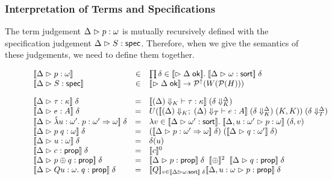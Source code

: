 \subsubsection{Interpretation of Terms and Specifications}

The term judgement ${\Delta} \vartriangleright {p} : {\omega}$ is mutually recursively
defined with the specification judgement ${\Delta} \vartriangleright {S} : \mathsf{spec}$. Therefore, when
we give the semantics of these judgements, we need to define them
together. 

\begin{figure}
\begin{displaymath}
\begin{array}{lcl}
\interp{\judgeA{p}{\omega}} & \in & \prod \delta \in \interp{\judgeACtx{\Delta}}.\; \interp{\judgeSort{\omega}}\;\delta \\
\interp{\judgeS{S}} & \in & \interp{\judgeACtx{\Delta}} \to \upset{W(\powerset{H})} \\[1em]

\interp{\judgeA{\tau}{\kappa}}\;\delta & = & 
   \interp{\judgeWK[\restrictkind{\Delta}]{\tau}{\kappa}}\; (\restricttyenv{\Delta}{\delta}) \\
\interp{\judgeA{e}{A}}\;\delta & = & 
   U(\interp{\judgeE[\restrictkind{\Delta}]{\restricttype{\Delta}}{e}{A}}\;
       (\restricttyenv{\Delta}{\delta})\; (K,K))\;
       (\restrictvals{\Delta}{\delta}) \\
\interp{\judgeA{\pfun{u}{\omega'}{p}}{\omega' \To \omega}}\;\delta & = & 
   \semfun{v \in \interp{\judgeSort{\omega'}}}{\interp{\judgeA[\Delta,u:\omega']{p}{\omega}}\;(\delta, v)} \\
\interp{\judgeA{p\;q}{\omega}}\;\delta & = & 
   (\interp{\judgeA{p}{\omega' \To \omega}}\;\delta)\;(\interp{\judgeA{q}{\omega'}}\;\delta) \\
\interp{\judgeA{u}{\omega}}\;\delta & = & \delta(u) \\

\interp{\judgeA{c}{\assert}}\;\delta & = & \interp{c}^0 \\

\interp{\judgeA{p \oplus q}{\assert}}\;\delta & = & 
    \interp{\judgeA{p}{\assert}}\;\delta \;\;\interp{\oplus}^2\;\;
    \interp{\judgeA{q}{\assert}}\;\delta \\

\interp{\judgeA{Q u:\omega.\; q}{\assert}}\;\delta & = & 
    \interp{Q}_{v \in \interp{\judgeSort{\omega}}\;\delta} 
        \interp{\judgeA[\Delta, u:\omega]{p}{\assert}}\;\delta \\


\end{array}
\end{displaymath}
\end{figure}
